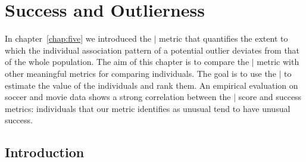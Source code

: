 
%
%

\chapter[Success and Outlierness]{Success and Outlierness}
\label{chap:six}


In chapter~\ref{chap:five} we introduced the $\mid$ metric that quantifies the extent to which the individual association pattern of a potential outlier deviates from that of the whole population. The aim of this chapter is to compare the $\mid$ metric with other meaningful metrics for comparing individuals. The goal is to use the $\mid$ to estimate the value of the individuals and rank them. 
An empirical evaluation on soccer and movie data shows a strong correlation between the $\mid$ score and success metrics: individuals that our metric identifies as unusual tend to have unusual success.

\section{Introduction}

